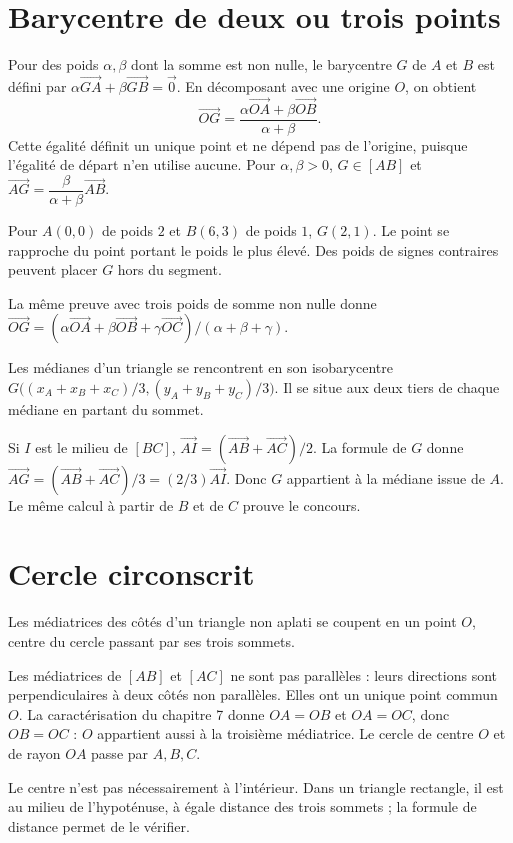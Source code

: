\documentclass[../cours_2de.tex]{subfiles}
\begin{document}
\section{Barycentre de deux ou trois points}
\approfondissement Pour des poids $\alpha,\beta$ dont la somme est non nulle,
le barycentre $G$ de $A$ et $B$ est défini par
$\alpha\overrightarrow{GA}+\beta\overrightarrow{GB}=\vec0$.
En décomposant avec une origine $O$, on obtient
\[
\overrightarrow{OG}=
\frac{\alpha\overrightarrow{OA}+\beta\overrightarrow{OB}}{\alpha+\beta}.
\]
Cette égalité définit un unique point et ne dépend pas de l'origine, puisque l'égalité de départ n'en utilise aucune.
Pour $\alpha,\beta>0$, $G\in[AB]$ et
$\overrightarrow{AG}=\dfrac{\beta}{\alpha+\beta}\overrightarrow{AB}$.
\begin{exemple}
Pour $A(0,0)$ de poids $2$ et $B(6,3)$ de poids $1$, $G(2,1)$.
Le point se rapproche du point portant le poids le plus élevé.
Des poids de signes contraires peuvent placer $G$ hors du segment.
\end{exemple}
La même preuve avec trois poids de somme non nulle donne
$\overrightarrow{OG}=(\alpha\overrightarrow{OA}+\beta\overrightarrow{OB}+\gamma\overrightarrow{OC})/(\alpha+\beta+\gamma)$.
\begin{theoreme}
Les médianes d'un triangle se rencontrent en son isobarycentre
$G\bigl((x_A+x_B+x_C)/3,(y_A+y_B+y_C)/3\bigr)$.
Il se situe aux deux tiers de chaque médiane en partant du sommet.
\end{theoreme}
\begin{demonstration}
Si $I$ est le milieu de $[BC]$,
$\overrightarrow{AI}=(\overrightarrow{AB}+\overrightarrow{AC})/2$.
La formule de $G$ donne
$\overrightarrow{AG}=(\overrightarrow{AB}+\overrightarrow{AC})/3
=(2/3)\overrightarrow{AI}$.
Donc $G$ appartient à la médiane issue de $A$. Le même calcul à partir de $B$ et de $C$ prouve le concours.
\end{demonstration}
\section{Cercle circonscrit}
\begin{theoreme}[Approfondissement]
Les médiatrices des côtés d'un triangle non aplati se coupent en un point $O$, centre du cercle passant par ses trois sommets.
\end{theoreme}
\begin{demonstration}
Les médiatrices de $[AB]$ et $[AC]$ ne sont pas parallèles : leurs directions sont perpendiculaires à deux côtés non parallèles. Elles ont un unique point commun $O$.
La caractérisation du chapitre 7 donne $OA=OB$ et $OA=OC$, donc $OB=OC$ : $O$ appartient aussi à la troisième médiatrice. Le cercle de centre $O$ et de rayon $OA$ passe par $A,B,C$.
\end{demonstration}
Le centre n'est pas nécessairement à l'intérieur. Dans un triangle rectangle, il est au milieu de l'hypoténuse, à égale distance des trois sommets ; la formule de distance permet de le vérifier.
\end{document}
